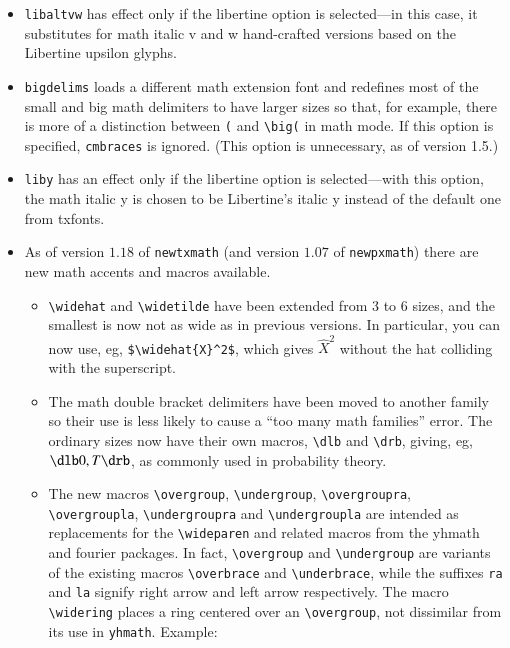 \documentclass[11pt]{article}
\theoremstyle{oldplain}
\theoremstyle{plain}
\begin{document}
\begin{itemize}
\begin{verbatim}
\def\symAMSb{5}
\documentclass[noamsfonts]{amsart} %or other AMS classes
\let\symAMSb\@undefined
\end{verbatim}
This method of loading the AMS class will save you two slots.
\item {\tt libaltvw} has effect only if the libertine option is selected---in this case, it substitutes for math italic v and w hand-crafted versions based on the Libertine upsilon glyphs.
\item{\tt bigdelims} loads a different math extension font and redefines most of the small and big math delimiters to have larger sizes so that, for example, there is more of a distinction between \verb|(| and \verb|\big(| in math mode. If this option is specified, {\tt cmbraces} is ignored. (This option is unnecessary, as of version 1.5.)
\item{\tt liby} has an effect only if the libertine option is selected---with this option, the math italic y is chosen to be Libertine's italic y instead of the default one from txfonts.
\item As of version $1.18$ of {\tt newtxmath} (and version $1.07$ of {\tt newpxmath}) there are new math accents and macros available.
\begin{itemize}
\item
\verb|\widehat| and \verb|\widetilde| have been extended from $3$ to $6$ sizes, and the smallest is now not as wide as in previous versions. In particular, you can now use, eg, \verb|$\widehat{X}^2$|, which gives $\widehat{X}^2$ without the hat colliding with the superscript.
\item The math double bracket delimiters have been moved to another family so their use is less likely to cause a ``too many math families'' error. The ordinary sizes now have their own macros, \verb|\dlb| and \verb|\drb|, giving, eg, $\dlb 0,T\drb$, as commonly used in probability theory.
\item The new macros \verb|\overgroup|, \verb|\undergroup|, \verb|\overgroupra|, \verb|\overgroupla|, \verb|\undergroupra| and \verb|\undergroupla| are intended as replacements for the \verb|\wideparen| and related macros from the \textsf{yhmath} and \textsf{fourier} packages. In fact, \verb|\overgroup| and \verb|\undergroup| are variants of the existing macros \verb|\overbrace| and \verb|\underbrace|, while the suffixes {\tt ra} and {\tt la} signify right arrow and left arrow respectively. The macro \verb|\widering| places a ring centered over an \verb|\overgroup|, not dissimilar from its use in {\tt yhmath}. Example:

\end{itemize}
\end{itemize}
\end{document}
